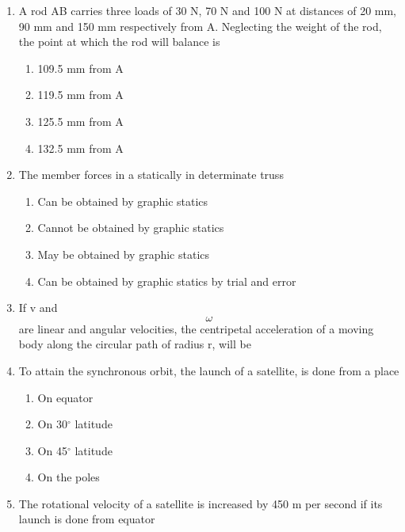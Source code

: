 \documentclass[11pt,a4paper]{article}
\begin{document}
\begin{enumerate}
\begin{enumerate*}[itemjoin=\qquad, label=\Alph*.]
\end{enumerate*}
\item{A rod AB carries three loads of 30 N, 70 N and 100 N at distances of 20 mm, 90 mm and 150 mm respectively from A. Neglecting the weight of the rod, the point at which the rod will balance is}
\begin{enumerate}[label=\Alph*.]
\item{109.5 mm from A}
\item{119.5 mm from A}
\item{125.5 mm from A}
\item{132.5 mm from A}
\end{enumerate}
\item{The member forces in a statically in determinate truss}
\begin{enumerate}[label=\Alph*.]
\item{Can be obtained by graphic statics}
\item{Cannot be obtained by graphic statics}
\item{May be obtained by graphic statics}
\item{Can be obtained by graphic statics by trial and error}
\end{enumerate}
\item{If v and $$\omega $$ are linear and angular velocities, the centripetal acceleration of a moving body along the circular path of radius r, will be
}
\\
\item{To attain the synchronous orbit, the launch of a satellite, is done from a place}
\begin{enumerate}[label=\Alph*.]
\item{On equator}
\item{On 30$^\circ$ latitude}
\item{On 45$^\circ$ latitude}
\item{On the poles}
\end{enumerate}
\item{The rotational velocity of a satellite is increased by 450 m per second if its launch is done from equator}

\end{enumerate}
\end{document}
